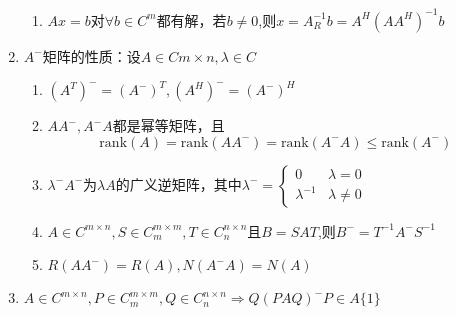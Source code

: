 \begin{enumerate}
\begin{enumerate}
		\item $Ax=b$对$\forall b \in C^{m}$都有解，若$b\ne 0$,则$x=A_R^{-1}b=A^H(AA^H)^{-1}b$
	\end{enumerate}
\item $A^{-}$矩阵的性质：设$A\in C{m\times n}, \lambda \in C$
	\begin{enumerate}
		\item $(A^T)^{-}=(A^{-})^T,(A^H)^{-}=(A^{-})^H$
		\item $AA^{-},A^{-}A$都是幂等矩阵，且
		\[
		\mathrm{rank}(A)=\mathrm{rank}(AA^{-})=\mathrm{rank}(A^{-}A)\leq\mathrm{rank}(A^{-})
		\]
		\item $\lambda^{-}A^{-}$为$\lambda A$的广义逆矩阵，其中$\lambda^{-}=\left\{\begin{array}{ll}
			0&\lambda =0\\
			\lambda^{-1}&\lambda \ne 0
		\end{array}\right.$
	\item $A \in C^{m\times n}, S \in C^{m\times m}_m,T\in  C^{n\times n}_n$且$B=SAT$,则$B^{-}=T^{-1}A^{-}S^{-1}$
	\item $R(AA^{-})=R(A),N(A^{-}A)=N(A)$
	\end{enumerate}
\item  $A \in C^{m\times n}, P \in C^{m\times m}_m,Q\in  C^{n\times n}_n\Rightarrow Q(PAQ)^{-}P\in A\{1\}$
\end{enumerate}






